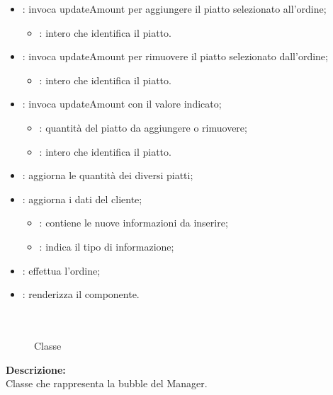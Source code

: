 \begin{itemize}
	\item {}: invoca updateAmount per aggiungere il piatto selezionato all'ordine;
		\begin{itemize}
			\item {}: intero che identifica il piatto.
		\end{itemize}
	\item {}: invoca updateAmount per rimuovere il piatto selezionato dall'ordine;
		\begin{itemize}
			\item {}: intero che identifica il piatto.
		\end{itemize}
	\item {}: invoca updateAmount con il valore indicato;
		\begin{itemize}
			\item {}: quantità del piatto da aggiungere o rimuovere;
			\item {}: intero che identifica il piatto.
		\end{itemize}
	\item {}: aggiorna le quantità dei diversi piatti;
	\item {}: aggiorna i dati del cliente;
		\begin{itemize}
			\item {}: contiene le nuove informazioni da inserire;
			\item {}: indica il tipo di informazione;
		\end{itemize}
	\item {}: effettua l'ordine;
	\item {}: renderizza il componente.
\end{itemize}

\paragraph[::BubbleManager]{\class}\mbox{}\\ \label{\class}
\begin{figure}[H]
	\centering
	\caption{Classe \class}
\end{figure}
\textbf{Descrizione:}\\
Classe che rappresenta la bubble del Manager.

